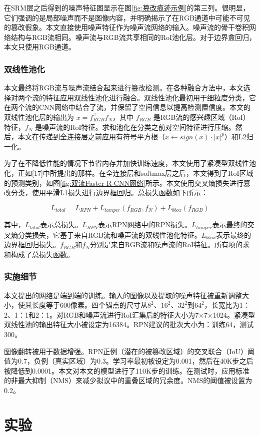 \documentclass[a4paper]{article}
\begin{document}
在SRM层之后得到的噪声特征图显示在图\ref{fig:篡改痕迹示例}的第三列。很明显，它们强调的是局部噪声而不是图像内容，并明确揭示了在RGB通道中可能不可见的篡改假象。本文直接使用噪声特征作为噪声流网络的输入。噪声流的骨干卷积网络结构与RGB流相同。噪声流与RGB流共享相同的RoI池化层。对于边界盒回归，本文只使用RGB通道。

\subsubsection{双线性池化}
本文最终将RGB流与噪声流结合起来进行篡改检测。在各种融合方法中，本文选择对两个流的特征应用双线性池化进行融合。双线性池化最初用于细粒度分类，它在两个流的CNN网络中结合了流，并保留了空间信息以提高检测置信度。本文的双线性池化层的输出为 $x = f_{RGB}^\top f_N$，其中 $f_{RGB}$ 是RGB流的感兴趣区域（RoI）特征，$f_N$ 是噪声流的RoI特征。求和池化在分类之前对空间特征进行压缩。然后，本文在传递到全连接层之前应用有符号平方根（$x \leftarrow {sign}(x) \cdot |x|^{p}$）和L2归一化。

为了在不降低性能的情况下节省内存并加快训练速度，本文使用了紧凑型双线性池化，正如[17]中所提出的那样。在全连接层和softmax层之后，本文得到了RoI区域的预测类别，如图\ref{fig:双流Faster R-CNN网络}所示。本文使用交叉熵损失进行篡改分类，使用平滑L1损失进行边界框回归。总损失函数如下所示：

\begin{equation}
L_{total} = L_{RPN} + L_{tamper}(f_{RGB}, f_{N}) + L_{bbox}(f_{RGB})
\end{equation}

其中，$L_{total}$表示总损失。$L_{RPN}$表示RPN网络中的RPN损失。$L_{tamper}$表示最终的交叉熵分类损失，它基于来自RGB流和噪声流的双线性池化特征。$L_{bbox}$表示最终的边界框回归损失。$f_{RGB}$和$f_{N}$分别是来自RGB流和噪声流的RoI特征。所有项的求和构成了总损失函数。

\subsubsection{实施细节}
本文提出的网络是端到端的训练。输入的图像以及提取的噪声特征被重新调整大小，使其长度等于600像素。四个锚点的尺寸从$8^2$、$16^2$、$32^2$到$64^2$，长宽比为1：2、1：1和2：1。对RGB和噪声流进行RoI汇集后的特征大小为7×7×1024。紧凑型双线性池的输出特征大小被设定为16384。RPN建议的批次大小为：训练64，测试300。

图像翻转被用于数据增强。RPN正例（潜在的被篡改区域）的交叉联合（IoU）阈值为0.7，负例（真实区域）为0.3。学习率最初被设定为0.001，然后在40K步之后被降低到0.0001。本文对本文的模型进行了110K步的训练。在测试时，应用标准的非最大抑制（NMS）来减少拟议中的重叠区域的冗余度。NMS的阈值被设置为0.2。

\section{实验}
\end{document}
